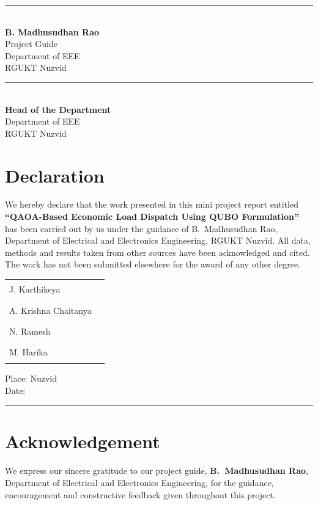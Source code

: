 \vspace{3cm}
\noindent
\begin{minipage}[t]{0.48\textwidth}
\rule{5cm}{0.4pt}\\
\textbf{B. Madhusudhan Rao}\\
Project Guide\\
Department of EEE\\
RGUKT Nuzvid
\end{minipage}\hfill
\begin{minipage}[t]{0.48\textwidth}\raggedleft
\rule{5cm}{0.4pt}\\
\textbf{Head of the Department}\\
Department of EEE\\
RGUKT Nuzvid
\end{minipage}

\chapter*{Declaration}
We hereby declare that the work presented in this mini project report entitled \textbf{``QAOA-Based Economic Load Dispatch Using QUBO Formulation''} has been carried out by us under the guidance of B.~Madhusudhan Rao, Department of Electrical and Electronics Engineering, RGUKT Nuzvid. All data, methods and results taken from other sources have been acknowledged and cited. The work has not been submitted elsewhere for the award of any other degree.

\vspace{2.5cm}
\noindent
\begin{tabular}{@{}p{}p{}@{}}
J. Karthikeya & \rule{4cm}{0.4pt}\\[14pt]
A. Krishna Chaitanya & \rule{4cm}{0.4pt}\\[14pt]
N. Ramesh & \rule{4cm}{0.4pt}\\[14pt]
M. Harika & \rule{4cm}{0.4pt}\\
\end{tabular}

\vspace{1cm}
\noindent Place: Nuzvid\\
Date: \rule{3cm}{0.4pt}

\chapter*{Acknowledgement}
We express our sincere gratitude to our project guide, \textbf{B.~Madhusudhan Rao}, Department of Electrical and Electronics Engineering, for the guidance, encouragement and constructive feedback given throughout this project.

